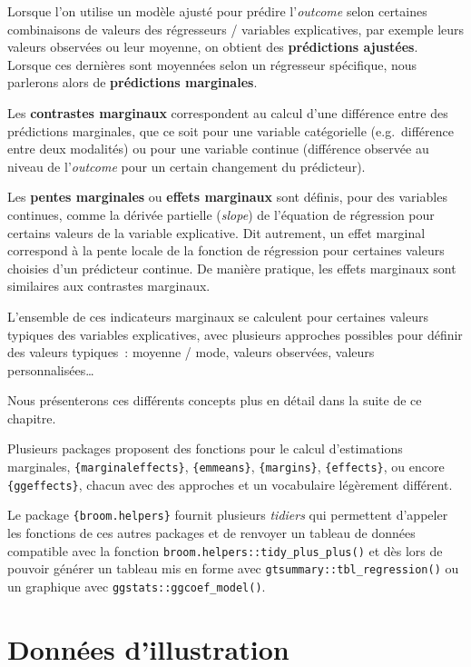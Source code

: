 \documentclass[
  letterpaper,
  DIV=11,
  numbers=noendperiod,
  oneside]{scrreprt}
\begin{document}
Lorsque l'on utilise un modèle ajusté pour prédire l'\emph{outcome}
selon certaines combinaisons de valeurs des régresseurs / variables
explicatives, par exemple leurs valeurs observées ou leur moyenne, on
obtient des \textbf{prédictions ajustées}. Lorsque ces dernières sont
moyennées selon un régresseur spécifique, nous parlerons alors de
\textbf{prédictions marginales}.

Les \textbf{contrastes marginaux} correspondent au calcul d'une
différence entre des prédictions marginales, que ce soit pour une
variable catégorielle (e.g.~différence entre deux modalités) ou pour une
variable continue (différence observée au niveau de l'\emph{outcome}
pour un certain changement du prédicteur).

Les \textbf{pentes marginales} ou \textbf{effets marginaux} sont
définis, pour des variables continues, comme la dérivée partielle
(\emph{slope}) de l'équation de régression pour certains valeurs de la
variable explicative. Dit autrement, un effet marginal correspond à la
pente locale de la fonction de régression pour certaines valeurs
choisies d'un prédicteur continue. De manière pratique, les effets
marginaux sont similaires aux contrastes marginaux.

L'ensemble de ces indicateurs marginaux se calculent pour certaines
valeurs typiques des variables explicatives, avec plusieurs approches
possibles pour définir des valeurs typiques~: moyenne / mode, valeurs
observées, valeurs personnalisées\ldots{}

Nous présenterons ces différents concepts plus en détail dans la suite
de ce chapitre.

Plusieurs packages proposent des fonctions pour le calcul d'estimations
marginales, \texttt{\{marginaleffects\}}, \texttt{\{emmeans\}},
\texttt{\{margins\}}, \texttt{\{effects\}}, ou encore
\texttt{\{ggeffects\}}, chacun avec des approches et un vocabulaire
légèrement différent.

Le package \texttt{\{broom.helpers\}} fournit plusieurs \emph{tidiers}
qui permettent d'appeler les fonctions de ces autres packages et de
renvoyer un tableau de données compatible avec la fonction
\texttt{broom.helpers::tidy\_plus\_plus()} et dès lors de pouvoir
générer un tableau mis en forme avec
\texttt{gtsummary::tbl\_regression()} ou un graphique avec
\texttt{ggstats::ggcoef\_model()}.

\hypertarget{donnuxe9es-dillustration}{%
\section{Données d'illustration}\label{donnuxe9es-dillustration}}
\end{document}

